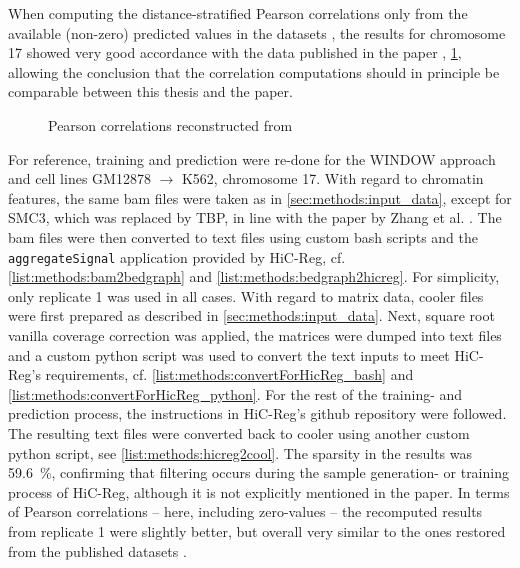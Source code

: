 When computing the distance-stratified Pearson correlations only from the available (non-zero) predicted values in the datasets \cite{ShiluZhang2019,ShiluZhang2019a},
the results for chromosome 17 showed very good accordance with the data published in the paper \cite[fig.\,10]{Zhang2019}, \cref{fig:methods:zhang_correlations_reconstructed},
allowing the conclusion that the correlation computations should in principle be comparable between this thesis and the paper.
\begin{figure}[htbp]
 \begin{subfigure}{0.45\textwidth}
 \end{subfigure}\hfill
 \begin{subfigure}{0.45\textwidth}
 \end{subfigure}
\caption{Pearson correlations reconstructed from \cite{Zhang2019}} \label{fig:methods:zhang_correlations_reconstructed}
\end{figure}

For reference, training and prediction were re-done for the WINDOW approach and cell lines GM12878 $\rightarrow$ K562, chromosome 17.
With regard to chromatin features, the same bam files were taken as in \cref{sec:methods:input_data}, except for SMC3, which was replaced by TBP,
in line with the paper by Zhang et al. \cite{Zhang2019}. 
The bam files were then converted to text files using custom bash scripts and the \texttt{aggregateSignal} application provided by HiC-Reg, 
cf. \cref{list:methods:bam2bedgraph} and \ref{list:methods:bedgraph2hicreg}. 
For simplicity, only replicate 1 was used in all cases.
With regard to matrix data, cooler files were first prepared as described in \cref{sec:methods:input_data}.
Next, square root vanilla coverage correction was applied, the matrices were dumped into text files and a custom python script was used
to convert the text inputs to meet HiC-Reg's requirements, cf. \cref{list:methods:convertForHicReg_bash} and \ref{list:methods:convertForHicReg_python}.
For the rest of the training- and prediction process, the instructions in HiC-Reg's github repository were followed.
The resulting text files were converted back to cooler using another custom python script, see \cref{list:methods:hicreg2cool}.
The sparsity in the results was \SI{59.6}{\percent}, confirming that filtering occurs during the sample generation- or training process of HiC-Reg,
although it is not explicitly mentioned in the paper.
In terms of Pearson correlations -- here, including zero-values -- the recomputed results from replicate 1 were slightly better,
but overall very similar to the ones restored from the published datasets \cite{ShiluZhang2019,ShiluZhang2019a}. 


